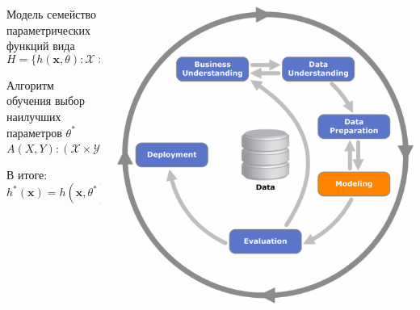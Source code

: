 \documentclass[10pt]{beamer}
\begin{document}
\begin{frame}{}

\begin{columns}[C]
    \begin{column}{.5\textwidth}
    \begin{block}{Модель}
    семейство параметрических функций вида
    \[
    H = \{h(\mathbf{x}, \theta): \mathcal{X} \times \Theta \rightarrow \mathcal{Y} \}
    \]    
    \end{block}
    \begin{block}{Алгоритм обучения}
    выбор наилучших параметров $\theta^*$
    \[
    A(X, Y): (\mathcal{X} \times \mathcal{Y})^N \rightarrow \Theta
    \]    
    \end{block}
    В итоге:
    \[
    h^*(\mathbf{x}) = h(\mathbf{x}, \theta^*)
    \]
    		
    \end{column}
       
    \begin{column}{.5\textwidth}
    \vspace{-0em}
	\begin{center}
   		\includegraphics[width=\textwidth]{images/crisp-m.png}
    \end{center}
    \end{column}
  \end{columns}

\end{frame}
\end{document}
